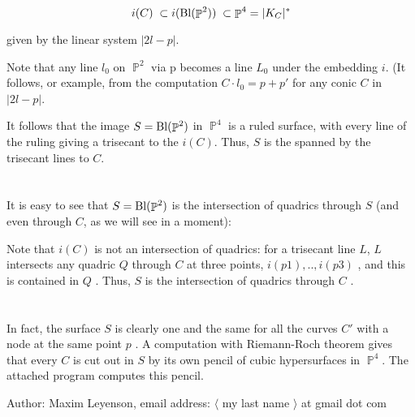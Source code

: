 \documentclass{amsart} %
\newcommand{\<}{\langle }
\renewcommand{\>}{\rangle }
\newcommand{\PP}{\mathop{\mathbb{P}}\nolimits}
\newcommand{\Bl}{\mathop{\rm Bl}\nolimits}  %
\begin{document}
\[
   i(C) \; \subset i(\Bl(\PP^2)) \; \subset \PP^4 = |K_C|^*
\]

given by the linear system $|2l - p|$.

Note that any line $l_0$ on $\PP^2$ via p becomes a line $L_0$ under the embedding
$i$. (It follows, or example, from the computation $C \cdot l_0 = p + p'$ for
any conic $C$ in $|2l - p|$.

It follows that the image $ S = \Bl(\PP^2) $ in $\PP^4$  is a ruled surface, with every line 
of the ruling giving a trisecant to the $ i(C) $. Thus, $ S $ is the spanned by the trisecant lines
to $ C $.


\section{}%
\label{sec:section name}

It is easy to see that $ S = \Bl(\PP^2) $ is the intersection of quadrics through $ S $ (and even
through $ C $, as we will see in a moment):

Note that $ i(C) $ is not an intersection of quadrics: for a trisecant line $ L $,
$ L$ intersects any quadric  $ Q $ through $C$ at three points, $  i(p1),.., i(p3) $ ,
and this is contained in $ Q $ . Thus, $ S $ is the intersection of quadrics through
$ C $ .

\section{}%
\label{sec:}




In fact, the surface $S$ is clearly one and the same for all the
curves $C'$ with a node
at the same point $p$  . A computation with Riemann-Roch theorem gives that every $C$ is cut out in $ S $ 
by its own pencil of cubic hypersurfaces in $\PP^4$. The attached program computes this pencil.


\vspace{10mm} %
Author: Maxim Leyenson, email address: $\<$ my last name $ \> $ at gmail dot com 


\vspace{10mm} %
\end{document}
